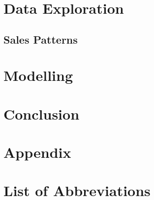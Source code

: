 \documentclass[11pt, twoside]{article}
\numberwithin{equation}{section}
\numberwithin{table}{section}
\numberwithin{figure}{section}
\begin{document}
\thispagestyle{plain}
\section{Data Exploration} \label{sec:data_exploration}

\subsection{Sales Patterns} \label{ssec:sales_patterns}

\newpage
\thispagestyle{empty}
\cleardoublepage

\thispagestyle{plain}
\section{Modelling} \label{sec:modelling}
\newpage
\thispagestyle{empty}
\cleardoublepage


\fancyhf{}
\fancyhead[LO,RE]{\footnotesize \nouppercase{\leftmark}}
\fancyhead[RO,LE]{\footnotesize \thepage}


\thispagestyle{plain}
\section{Conclusion} \label{sec:conclusion}
%
\newpage
\thispagestyle{empty}
\cleardoublepage


\fancyhf{}
\fancyhead[LO]{\footnotesize \nouppercase{\rightmark}}
\fancyhead[RE]{\footnotesize \nouppercase{\leftmark}}
\fancyhead[RO,LE]{\footnotesize \thepage}



\thispagestyle{plain}
\section*{Appendix} \label{sec:appendix}

\newpage
\thispagestyle{empty}
\cleardoublepage


\fancyhf{}
\fancyhead[LO,RE]{\footnotesize \nouppercase{\leftmark}}
\fancyhead[RO,LE]{\footnotesize \thepage}



\thispagestyle{plain}
\section*{List of Abbreviations}

\newpage
\thispagestyle{empty}
\cleardoublepage
\end{document}
